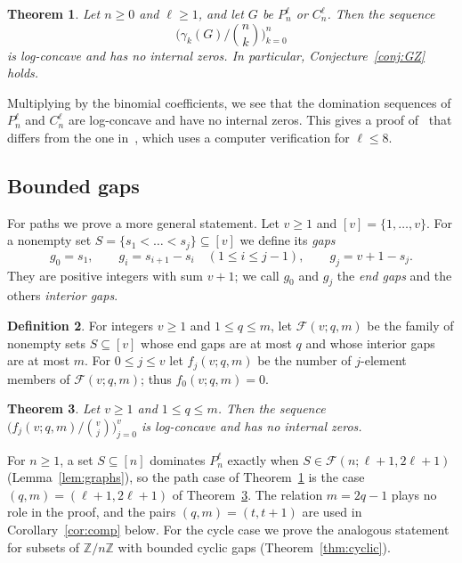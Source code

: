 \documentclass{amsart}
\newtheorem{theorem}{Theorem}[section]
\theoremstyle{definition}
\newtheorem{definition}[theorem]{Definition}
\theoremstyle{remark}
\numberwithin{equation}{section}
\newcommand{\cF}{\mathcal{F}}
\newcommand{\Z}{\mathbb{Z}}
\begin{document}
\begin{theorem}\label{thm:main}
Let $n\ge0$ and $\ell\ge1$, and let $G$ be $P_n^\ell$ or $C_n^\ell$. Then the sequence
\[
\biggl(\gamma_k(G)\Big/\binom nk\biggr)_{k=0}^{n}
\]
is log-concave and has no internal zeros. In particular, Conjecture~\ref{conj:GZ} holds.
\end{theorem}

Multiplying by the binomial coefficients, we see that the domination sequences of $P_n^\ell$ and $C_n^\ell$ are log-concave and have no internal zeros. This gives a proof of~\cite[Theorem~1.4]{GZ} that differs from the one in~\cite{GZ}, which uses a computer verification for $\ell\le8$.

\subsection*{Bounded gaps}
For paths we prove a more general statement. Let $v\ge1$ and $[v]=\{1,\dots,v\}$. For a nonempty set $S=\{s_1<\dots<s_j\}\subseteq[v]$ we define its \emph{gaps}
\begin{equation}\label{eq:gaps}
g_0=s_1,\qquad g_i=s_{i+1}-s_i\quad(1\le i\le j-1),\qquad g_j=v+1-s_j.
\end{equation}
They are positive integers with sum $v+1$; we call $g_0$ and $g_j$ the \emph{end gaps} and the others \emph{interior gaps}.

\begin{definition}\label{def:F}
For integers $v\ge1$ and $1\le q\le m$, let $\cF(v;q,m)$ be the family of nonempty sets $S\subseteq[v]$ whose end gaps are at most $q$ and whose interior gaps are at most $m$. For $0\le j\le v$ let $f_j(v;q,m)$ be the number of $j$-element members of $\cF(v;q,m)$; thus $f_0(v;q,m)=0$.
\end{definition}

\begin{theorem}\label{thm:gaps}
Let $v\ge1$ and $1\le q\le m$. Then the sequence $\bigl(f_j(v;q,m)/\binom vj\bigr)_{j=0}^{v}$ is log-concave and has no internal zeros.
\end{theorem}

For $n\ge1$, a set $S\subseteq[n]$ dominates $P_n^\ell$ exactly when $S\in\cF(n;\ell+1,2\ell+1)$ (Lemma~\ref{lem:graphs}), so the path case of Theorem~\ref{thm:main} is the case $(q,m)=(\ell+1,2\ell+1)$ of Theorem~\ref{thm:gaps}. The relation $m=2q-1$ plays no role in the proof, and the pairs $(q,m)=(t,t+1)$ are used in Corollary~\ref{cor:comp} below. For the cycle case we prove the analogous statement for subsets of $\Z/n\Z$ with bounded cyclic gaps (Theorem~\ref{thm:cyclic}).
\end{document}
